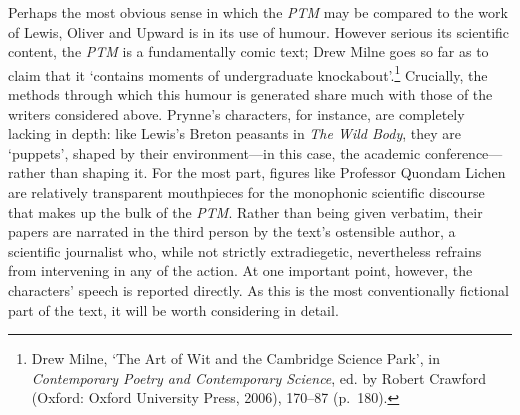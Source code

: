 \documentclass[]{article}
\begin{document}
Perhaps the most obvious sense in which the \emph{PTM} may be compared
to the work of Lewis, Oliver and Upward is in its use of humour. However
serious its scientific content, the \emph{PTM} is a fundamentally comic
text; Drew Milne goes so far as to claim that it `contains moments of
undergraduate knockabout'.\footnote{Drew Milne, `The Art of Wit and the
  Cambridge Science Park', in \emph{Contemporary Poetry and Contemporary
  Science}, ed. by Robert Crawford (Oxford: Oxford University Press,
  2006), 170--87 (p.~180).} Crucially, the methods through which this
humour is generated share much with those of the writers considered
above. Prynne's characters, for instance, are completely lacking in
depth: like Lewis's Breton peasants in \emph{The Wild Body}, they are
`puppets', shaped by their environment---in this case, the academic
conference---rather than shaping it. For the most part, figures like
Professor Quondam Lichen are relatively transparent mouthpieces for the
monophonic scientific discourse that makes up the bulk of the
\emph{PTM}. Rather than being given verbatim, their papers are narrated
in the third person by the text's ostensible author, a scientific
journalist who, while not strictly extradiegetic, nevertheless refrains
from intervening in any of the action. At one important point, however,
the characters' speech is reported directly. As this is the most
conventionally fictional part of the text, it will be worth considering
in detail.
\end{document}
